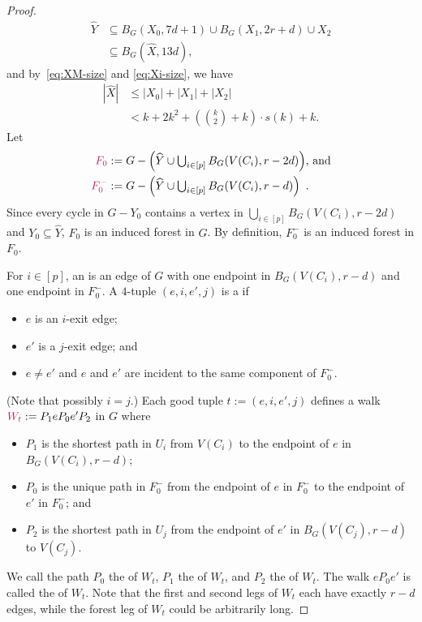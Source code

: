 \documentclass{patmorin}
\newcommand{\piotr}[1]{\textcolor{red}{Piotr: #1}}
\begin{document}
\begin{proof}
\begin{equation}
\begin{split}
\widehat{Y}&\textstyle\subseteq B_G(X_0,7d+1) \cup B_G(X_1,2r+d) \cup X_2\\
&\subseteq B_G(\widehat{X}, 13d), 
\end{split} 
\end{equation}
and by~\eqref{eq:XM-size} and \eqref{eq:Xi-size},  we have 
\begin{equation}
\begin{split}
|\widehat{X}|& \textstyle \leq |X_0| + |X_1| + |X_2|  \\
&\textstyle< k + 2k^2+(\binom{k}{2}+k)\cdot s(k) + k. %
\end{split} \label{x_prime_size}
\end{equation}
Let
\begin{align*}
\mathdefin{F_0}&:=\textstyle{G-\left(\widehat{Y}\cup \bigcup_{i\in[p]} B_G(V(C_i),r-2d)\right)}\text{, and}\\
\mathdefin{F^-_0}&:=\textstyle{G-\left(\widehat{Y}\cup \bigcup_{i\in[p]} B_G(V(C_i),r-d)\right)} \enspace . 
\end{align*}
Since every cycle in $G-Y_0$ contains a vertex in $\bigcup_{i\in[p]} B_G(V(C_i),r-2d)$ and $Y_0\subseteq \widehat{Y}$, $F_0$ is an induced forest in $G$. By definition, $F^-_0$  is an induced forest in $F_0$.

For $i\in[p]$, an  is an edge of $G$ with one endpoint in $B_G(V(C_i),r-d)$ and one endpoint in $F_0^-$.
A $4$-tuple $(e,i,e',j)$ is a  if
\begin{itemize}[noitemsep,nosep]
  \item $e$ is an $i$-exit edge;
  \item $e'$ is a $j$-exit edge;
  and \item $e\neq e'$ and $e$ and $e'$ are incident to the same component of $F_0^-$.
\end{itemize}
(Note that possibly $i=j$.) 
Each good tuple $t:=(e,i,e',j)$  defines a walk $\mathdefin{W_t}:=P_1eP_0e'P_2$ in $G$ where
\begin{itemize}[noitemsep,nosep]
  \item $P_1$ is the shortest path in $U_i$ from $V(C_i)$ to the endpoint of $e$ in $B_G(V(C_i),r-d)$;
  \item $P_0$ is the unique path in $F_0^-$ from the endpoint of $e$ in $F^-_0$ to the endpoint of $e'$ in $F^-_0$; and
  \item $P_2$ is the shortest path in $U_j$ from the endpoint of $e'$ in $B_G(V(C_j),r-d)$ to $V(C_j)$.
\end{itemize}
We call the path $P_0$ the  of $W_t$, $P_1$ the  of $W_t$, and $P_2$ the  of $W_t$.  The walk $eP_0e'$ is called the  of $W_t$.  Note that the first and second legs of $W_t$ each have exactly $r-d$ edges, while the forest leg of $W_t$ could be arbitrarily long.


\end{proof}
\end{document}
